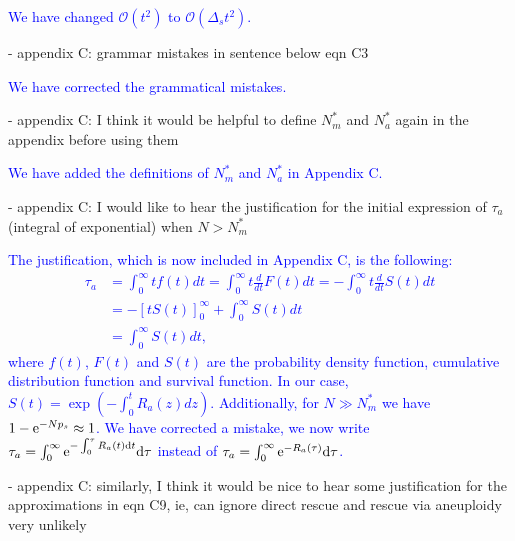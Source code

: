 \documentclass[12pt]{extarticle}
\renewcommand{\d}{{\rm d}}
\newcommand{\e}{{\rm e}}
\begin{document}
\textcolor{blue}{We have changed $\mathcal{O}\left(t^2\right)$ to $\mathcal{O}\left(\Delta_st^2\right)$. } %

- appendix C: grammar mistakes in sentence below eqn C3

\textcolor{blue}{We have corrected the grammatical mistakes. } %

- appendix C: I think it would be helpful to define $N_m^*$ and $N_a^*$ again in the appendix before using them

\textcolor{blue}{We have added the definitions of $N_m^*$ and $N_a^*$ in Appendix C. } %

- appendix C: I would like to hear the justification for the initial expression of $\tau_a$ (integral of exponential) when $N>N_m^*$

\textcolor{blue}{%
The justification, which is now included in Appendix C, is the following: 
\begin{align*}
\tau_a&=\int_0^\infty tf(t)dt=\int_0^\infty t\frac{d}{dt}F(t)dt=-\int_0^\infty t\frac{d}{dt}S(t)dt\\
&=-\left[tS(t)\right]_0^\infty+\int_0^\infty S(t)dt\\
&=\int_0^\infty S(t)dt,
\end{align*}
where $f(t)$, $F(t)$ and $S(t)$ are the probability density function, cumulative distribution function and survival function.
In our case, $S(t)=\exp\left(-\int_0^t R_a(z)dz\right)$.
Additionally, for $N\gg N_m^*$ we have $1-\e^{-Np_s}\approx1$. 
We have corrected a mistake, we now write $\tau_a=\int_0^\infty \e^{-\int_0^\tau R_a(t)\d t}\d\tau$
instead of $\tau_a=\int_0^\infty \e^{-R_a(\tau)}\d\tau$.
}

- appendix C: similarly, I think it would be nice to hear some justification for the approximations in eqn C9, ie, can ignore direct rescue and rescue via aneuploidy very unlikely
\end{document}
